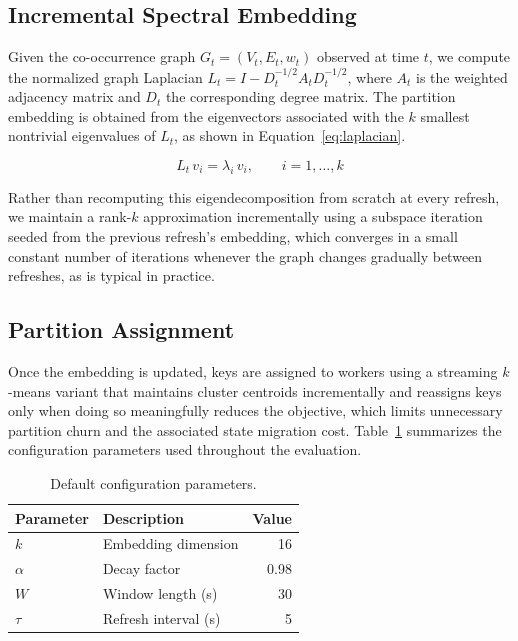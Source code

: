 \documentclass[10pt,twocolumn]{article}
\begin{document}
\subsection{Incremental Spectral Embedding}
Given the co-occurrence graph $G_t = (V_t, E_t, w_t)$ observed at time $t$,
we compute the normalized graph Laplacian $L_t = I - D_t^{-1/2} A_t
D_t^{-1/2}$, where $A_t$ is the weighted adjacency matrix and $D_t$ the
corresponding degree matrix. The partition embedding is obtained from the
eigenvectors associated with the $k$ smallest nontrivial eigenvalues of
$L_t$, as shown in Equation~\eqref{eq:laplacian}.

\begin{equation}
\label{eq:laplacian}
L_t \, v_i = \lambda_i \, v_i, \qquad i = 1, \dots, k
\end{equation}

Rather than recomputing this eigendecomposition from scratch at every
refresh, we maintain a rank-$k$ approximation incrementally using a subspace
iteration seeded from the previous refresh's embedding, which converges in a
small constant number of iterations whenever the graph changes gradually
between refreshes, as is typical in practice.

\subsection{Partition Assignment}
Once the embedding is updated, keys are assigned to workers using a
streaming $k$-means variant that maintains cluster centroids incrementally
and reassigns keys only when doing so meaningfully reduces the objective,
which limits unnecessary partition churn and the associated state migration
cost. Table~\ref{tab:params} summarizes the configuration parameters used
throughout the evaluation.

\begin{table}[t]
\centering
\caption{Default configuration parameters.}
\label{tab:params}
\begin{tabular}{@{}llr@{}}
\toprule
Parameter & Description & Value \\
\midrule
$k$ & Embedding dimension & 16 \\
$\alpha$ & Decay factor & 0.98 \\
$W$ & Window length (s) & 30 \\
$\tau$ & Refresh interval (s) & 5 \\
\bottomrule
\end{tabular}
\end{table}
\end{document}
